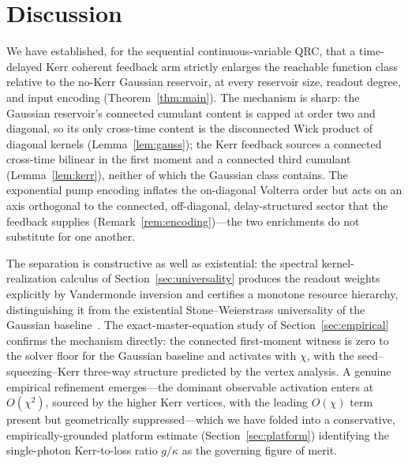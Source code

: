 \documentclass[11pt]{article}
\theoremstyle{remark}
\begin{document}
\section{Discussion}
\label{sec:discussion}

We have established, for the sequential continuous-variable QRC, that a
time-delayed Kerr coherent feedback arm strictly enlarges the reachable function
class relative to the no-Kerr Gaussian reservoir, at every reservoir size,
readout degree, and input encoding (Theorem~\ref{thm:main}). The mechanism is
sharp: the Gaussian reservoir's connected cumulant content is capped at order two
and diagonal, so its only cross-time content is the disconnected Wick product of
diagonal kernels (Lemma~\ref{lem:gauss}); the Kerr feedback sources a connected
cross-time bilinear in the first moment and a connected third cumulant
(Lemma~\ref{lem:kerr}), neither of which the Gaussian class contains. The
exponential pump encoding inflates the on-diagonal Volterra order but acts on an
axis orthogonal to the connected, off-diagonal, delay-structured sector that the
feedback supplies (Remark~\ref{rem:encoding})---the two enrichments do not
substitute for one another.

The separation is constructive as well as existential: the spectral
kernel-realization calculus of Section~\ref{sec:universality} produces the readout
weights explicitly by Vandermonde inversion and certifies a monotone
resource hierarchy, distinguishing it from the existential Stone--Weierstrass
universality of the Gaussian baseline~\cite{nokkala2021}. The exact-master-equation
study of Section~\ref{sec:empirical} confirms the mechanism directly: the
connected first-moment witness is zero to the solver floor for the Gaussian
baseline and activates with $\chi$, with the seed--squeezing--Kerr three-way
structure predicted by the vertex analysis. A genuine empirical refinement
emerges---the dominant observable activation enters at $O(\chi^2)$, sourced by the
higher Kerr vertices, with the leading $O(\chi)$ term present but geometrically
suppressed---which we have folded into a conservative, empirically-grounded
platform estimate (Section~\ref{sec:platform}) identifying the single-photon
Kerr-to-loss ratio $g/\kappa$ as the governing figure of merit.
\end{document}

